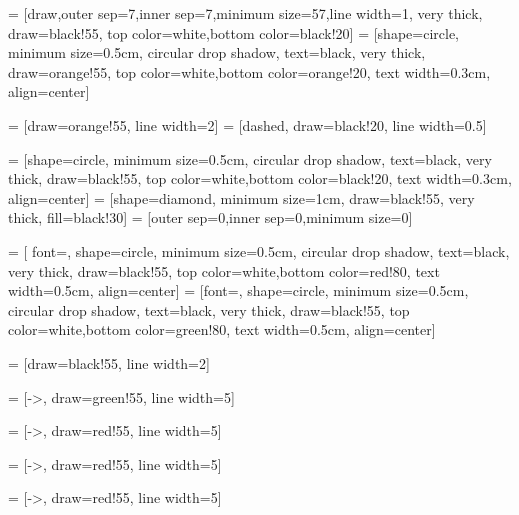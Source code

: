 

 

 = [draw,outer sep=7,inner sep=7,minimum size=57,line width=1, very thick, draw=black!55, top color=white,bottom color=black!20]
 = [shape=circle, minimum size=0.5cm, circular drop shadow, text=black, very thick, draw=orange!55, top color=white,bottom color=orange!20, text width=0.3cm, align=center]


 = [draw=orange!55, line width=2]
 = [dashed, draw=black!20, line width=0.5]



 = [shape=circle, minimum size=0.5cm, circular drop shadow, text=black, very thick, draw=black!55, top color=white,bottom color=black!20, text width=0.3cm, align=center]
 = [shape=diamond, minimum size=1cm, draw=black!55, very thick, fill=black!30]
 = [outer sep=0,inner sep=0,minimum size=0]

 = [  font={\huge\bfseries}, shape=circle, minimum size=0.5cm, circular drop shadow, text=black, very thick, draw=black!55, top color=white,bottom color=red!80, text width=0.5cm, align=center]
 = [font={\huge\bfseries}, shape=circle, minimum size=0.5cm, circular drop shadow, text=black, very thick, draw=black!55, top color=white,bottom color=green!80, text width=0.5cm, align=center]

 = [draw=black!55, line width=2]


 = [->, draw=green!55, line width=5]

 = [->, draw=red!55, line width=5]


 = [->, draw=red!55, line width=5]


 = [->, draw=red!55, line width=5]


